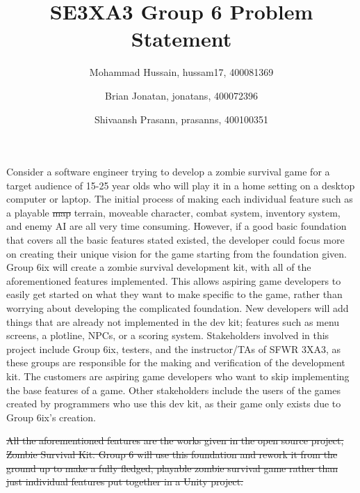\documentclass[12pt]{article}
\title{SE3XA3 Group 6 Problem Statement}
\author{Mohammad Hussain, hussam17, 400081369\\
		\and 
		Brian Jonatan, jonatans, 400072396
		\and
		Shivaansh Prasann, prasanns, 400100351}
\begin{document}
\maketitle

Consider a software engineer trying to develop a zombie survival game {\color{magenta} for a target audience of 15-25 year olds who will play it in a home setting on a desktop computer or laptop}.
The initial process of making each individual feature such as a playable \sout{map} {\color{magenta} terrain}, 
moveable character, combat system, inventory system, and 
enemy AI are all very time consuming. However, if a good basic foundation that 
covers all the basic features stated existed, the developer could focus more on 
creating their unique vision for the game starting from the foundation given. {\color{magenta} Group 6ix will create a zombie survival
development kit, with all of the aforementioned features implemented. This allows aspiring game developers to easily get started on what they want
to make specific to the game, rather than worrying about developing the complicated foundation. New developers will add things that are already not implemented
in the dev kit; features such as menu screens, a plotline, NPCs, or a scoring system. Stakeholders involved in this project include Group 6ix, testers, and the instructor/TAs
of SFWR 3XA3, as these groups are responsible for the making and verification of the development kit. The customers are aspiring game developers who want to skip implementing
the base features of a game. Other stakeholders include the users of the games created by programmers who use this dev kit, as their game only exists due to Group 6ix's creation. }


\sout{All the aforementioned features are the works given in the open source project, Zombie Survival Kit.
Group 6 will use this foundation and rework it from the ground up to make a fully fledged, playable 
zombie survival game rather than just individual features put together in a Unity project.}
\end{document}
